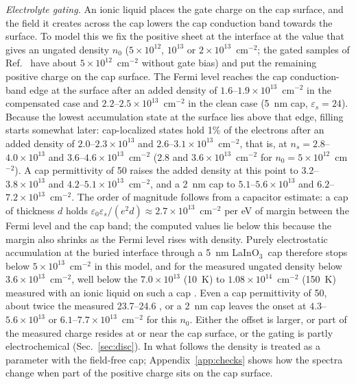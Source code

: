\documentclass[11pt]{article}
\newcommand{\LIO}{\texorpdfstring{LaInO$_3$}{LaInO3}}
\begin{document}
\emph{Electrolyte gating.} An ionic liquid places the gate charge on the cap surface, and the field it creates across the cap lowers the cap conduction band towards the surface. To model this we fix the positive sheet at the interface at the value that gives an ungated density $n_0$ ($5\times10^{12}$, $10^{13}$ or $2\times10^{13}$~cm$^{-2}$; the gated samples of Ref.~\cite{Lee2024LIO} have about $5\times10^{12}$~cm$^{-2}$ without gate bias) and put the remaining positive charge on the cap surface. The Fermi level reaches the cap conduction-band edge at the surface after an added density of $1.6$--$1.9\times10^{13}$~cm$^{-2}$ in the compensated case and $2.2$--$2.5\times10^{13}$~cm$^{-2}$ in the clean case (5~nm cap, $\varepsilon_s=24$). Because the lowest accumulation state at the surface lies above that edge, filling starts somewhat later: cap-localized states hold 1\% of the electrons after an added density of $2.0$--$2.3\times10^{13}$ and $2.6$--$3.1\times10^{13}$~cm$^{-2}$, that is, at $n_s=2.8$--$4.0\times10^{13}$ and $3.6$--$4.6\times10^{13}$~cm$^{-2}$ ($2.8$ and $3.6\times10^{13}$~cm$^{-2}$ for $n_0=5\times10^{12}$~cm$^{-2}$). A cap permittivity of 50 raises the added density at this point to $3.2$--$3.8\times10^{13}$ and $4.2$--$5.1\times10^{13}$~cm$^{-2}$, and a 2~nm cap to $5.1$--$5.6\times10^{13}$ and $6.2$--$7.2\times10^{13}$~cm$^{-2}$. The order of magnitude follows from a capacitor estimate: a cap of thickness $d$ holds $\varepsilon_0\varepsilon_s/(e^2d)\approx2.7\times10^{13}$~cm$^{-2}$ per eV of margin between the Fermi level and the cap band; the computed values lie below this because the margin also shrinks as the Fermi level rises with density. Purely electrostatic accumulation at the buried interface through a 5~nm \LIO\ cap therefore stops below $5\times10^{13}$~cm$^{-2}$ in this model, and for the measured ungated density below $3.6\times10^{13}$~cm$^{-2}$, well below the $7.0\times10^{13}$ (10~K) to $1.08\times10^{14}$~cm$^{-2}$ (150~K) measured with an ionic liquid on such a cap \cite{Lee2024LIO}. Even a cap permittivity of 50, about twice the measured 23.7--24.6 \cite{Jang2017LIO,Galazka2021}, or a 2~nm cap leaves the onset at $4.3$--$5.6\times10^{13}$ or $6.1$--$7.7\times10^{13}$~cm$^{-2}$ for this $n_0$. Either the offset is larger, or part of the measured charge resides at or near the cap surface, or the gating is partly electrochemical (Sec.~\ref{sec:disc}). In what follows the density is treated as a parameter with the field-free cap; Appendix~\ref{app:checks} shows how the spectra change when part of the positive charge sits on the cap surface.
\end{document}
